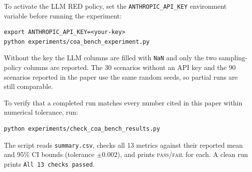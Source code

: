 \documentclass[sigconf]{acmart}
\begin{document}
To activate the LLM RED policy, set the \texttt{ANTHROPIC\_API\_KEY} environment variable before running the experiment:

\begin{verbatim}
export ANTHROPIC_API_KEY=<your-key>
python experiments/coa_bench_experiment.py
\end{verbatim}

Without the key the LLM columns are filled with \texttt{NaN} and only the two sampling-policy columns are reported. The 30 scenarios without an API key and the 90 scenarios reported in the paper use the same random seeds, so partial runs are still comparable.

To verify that a completed run matches every number cited in this paper within numerical tolerance, run:

\begin{verbatim}
python experiments/check_coa_bench_results.py
\end{verbatim}

The script reads \texttt{summary.csv}, checks all 13 metrics against their reported mean and 95\% CI bounds (tolerance $\pm 0.002$), and prints \textsc{pass}/\textsc{fail} for each. A clean run prints \texttt{All 13 checks passed}.
\end{document}
